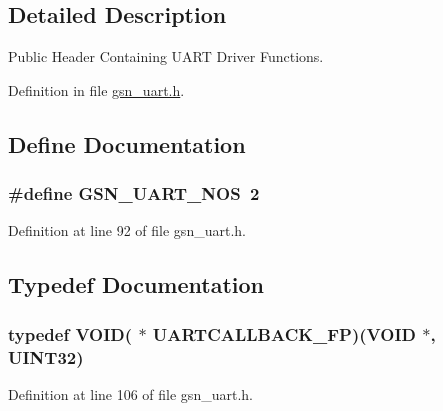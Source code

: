 \subsection{Detailed Description}
Public Header Containing UART Driver Functions. 

Definition in file \hyperlink{a00600_source}{gsn\_\-uart.h}.



\subsection{Define Documentation}
\hypertarget{a00600_a8d4d184d01326210338840c046d1fb04}{
\subsubsection[{GSN\_\-UART\_\-NOS}]{\setlength{\rightskip}{0pt plus 5cm}\#define GSN\_\-UART\_\-NOS~2}}
\label{a00600_a8d4d184d01326210338840c046d1fb04}


Definition at line 92 of file gsn\_\-uart.h.



\subsection{Typedef Documentation}
\hypertarget{a00600_a2e597592e12f52e6b9f19cffdcd2378f}{
\subsubsection[{UARTCALLBACK\_\-FP}]{\setlength{\rightskip}{0pt plus 5cm}typedef VOID( $\ast$ {\bf UARTCALLBACK\_\-FP})(VOID $\ast$, {\bf UINT32})}}
\label{a00600_a2e597592e12f52e6b9f19cffdcd2378f}


Definition at line 106 of file gsn\_\-uart.h.



